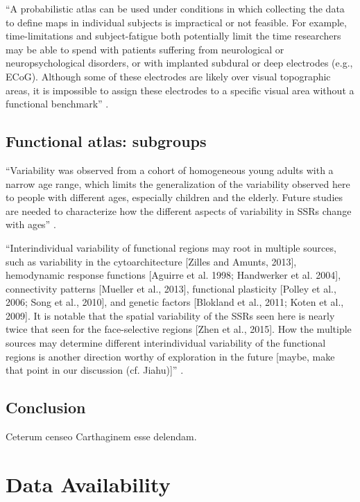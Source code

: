 ``A probabilistic atlas can be used under conditions in which collecting
the data to define maps in individual subjects is impractical or not feasible.
%
For example, time-limitations and subject-fatigue both potentially limit the
time researchers may be able to spend with patients suffering from
neurological or neuropsychological disorders, or with implanted subdural or deep
electrodes (e.g., ECoG).
%
Although some of these electrodes are likely over visual topographic areas, it
is impossible to assign these electrodes to a specific visual area without a
functional benchmark'' \citep{wang2015probabilistic}.


\subsection{Functional atlas: subgroups}

``Variability was observed from a cohort of homogeneous young adults with a
narrow age range, which limits the generalization of the variability observed
here to people with different ages, especially children and the elderly.
%
Future studies are needed to characterize how the different aspects of
variability in SSRs change with ages'' \citet{zhen2017quantifying}.

``Interindividual variability of functional regions may root in
multiple sources, such as variability in the cytoarchitecture [Zilles and
Amunts, 2013], hemodynamic response functions [Aguirre et al. 1998; Handwerker
et al. 2004], connectivity patterns [Mueller et al., 2013], functional
plasticity [Polley et al., 2006; Song et al., 2010], and genetic factors
[Blokland et al., 2011; Koten et al., 2009].
%
It is notable that the spatial variability of the SSRs seen here is nearly twice
that seen for the face-selective regions [Zhen et al., 2015]. How the multiple
sources may determine different interindividual variability of the functional
regions is another direction worthy of exploration in the future [maybe, make
that point in our discussion (cf. Jiahu)]'' \citep{zhen2017quantifying}.




\subsection{Conclusion}

Ceterum censeo Carthaginem esse delendam.


\section{Data Availability}

